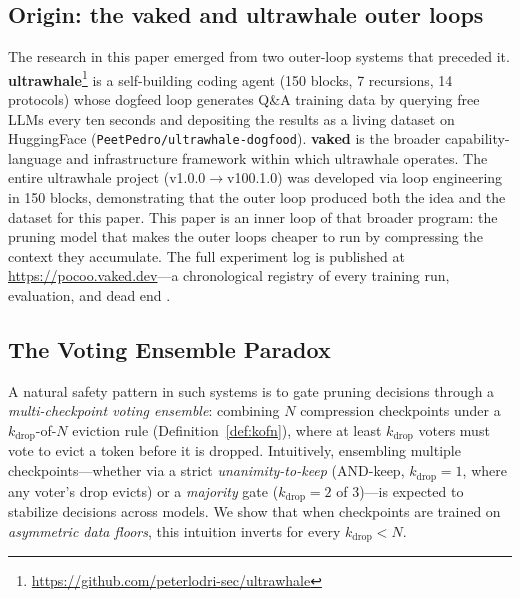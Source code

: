 \subsection{Origin: the vaked and ultrawhale outer loops}

The research in this paper emerged from two outer-loop systems that preceded
it. \textbf{ultrawhale}\footnote{\url{https://github.com/peterlodri-sec/ultrawhale}}
is a self-building coding agent (150 blocks, 7 recursions, 14 protocols) whose
dogfeed loop generates Q\&A training data by querying free LLMs every ten
seconds and depositing the results as a living dataset on HuggingFace
(\texttt{PeetPedro/ultrawhale-dogfood}). \textbf{vaked} is the broader
capability-language and infrastructure framework within which ultrawhale
operates. The entire ultrawhale project (v1.0.0$\to$v100.1.0) was
developed via loop engineering in 150 blocks, demonstrating that the outer
loop produced both the idea and the dataset for this paper. This paper is
an inner loop of that broader program: the pruning model that makes the
outer loops cheaper to
 run by compressing the context they accumulate. The full experiment log is
 published at \url{https://pocoo.vaked.dev}---a chronological registry of
 every training run, evaluation, and dead end
 \citep{lodri2026sapirwhorf,lodri2026selflabeling,lodri2026heretic,
 lodri2026silverlabel,lodri2026loopkit,lodri2026loopshipped}.

\subsection{The Voting Ensemble Paradox}

A natural safety pattern in such systems is to gate pruning decisions through
a \emph{multi-checkpoint voting ensemble}: combining $N$ compression
checkpoints under a $k_{\mathrm{drop}}$-of-$N$ eviction rule
(Definition~\ref{def:kofn}), where at least $k_{\mathrm{drop}}$ voters must
vote to evict a token before it is dropped. Intuitively, ensembling multiple
checkpoints---whether via a strict \emph{unanimity-to-keep} (AND-keep,
$k_{\mathrm{drop}}{=}1$, where any voter's drop evicts) or a \emph{majority}
gate ($k_{\mathrm{drop}}{=}2$ of $3$)---is expected to stabilize decisions across
models. We show that when checkpoints are trained on \emph{asymmetric data
floors}, this intuition inverts for every $k_{\mathrm{drop}} < N$.

